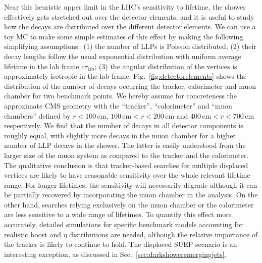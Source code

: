 \begin{enumerate}
Near this heuristic upper limit in the LHC's sensitivity to lifetime, the shower effectively gets stretched out over the detector elements, and it is useful to study how the decays are distributed over the different detector elements. We can use a toy MC to make some simple estimates of this effect by making the following simplifying assumptions:~(1) the number of LLPs is Poisson distributed; (2) their decay lengths follow the usual exponential distribution with uniform average lifetime in the lab frame $c\tau_{\text{lab}}$; (3) the angular distribution of the vertices is approximately isotropic in the lab frame. Fig.~\ref{fig:detectorelements} shows the distribution of the number of decays occurring the tracker, calorimeter and muon chamber for two benchmark points. We hereby assume for concreteness the approximate CMS geometry with the ``tracker'', ``calorimeter'' and ``muon chambers'' defined by $r<100\, \text{cm}$, $100\, \text{cm}<r<200\, \text{cm}$  and  $400\, \text{cm}<r<700\, \text{cm}$ respectively. We find that the number of decays in all detector components is roughly equal, with slightly more decays in the muon chamber for a higher number of LLP decays in the shower. The latter is easily understood from the larger size of the muon system as compared to the tracker and the calorimeter.  The qualitative conclusion is that tracker-based searches for multiple displaced vertices are likely to have reasonable sensitivity over the whole relevant lifetime range. For  longer lifetimes, the sensitivity will necessarily degrade although it can be partially recovered by incorporating the muon chamber in the analysis. On the other hand, searches relying exclusively on the muon chamber or the calorimeter are less sensitive to a wide range of lifetimes. To quantify this effect more accurately, detailed simulations for specific benchmark models accounting for  realistic boost and $\eta$ distributions are  needed, although the relative importance of the tracker is likely to continue to hold. The displaced SUEP scenario is an interesting exception, as discussed in Sec.~\ref{sec:darkshoweremergingjets}.


\end{enumerate}
